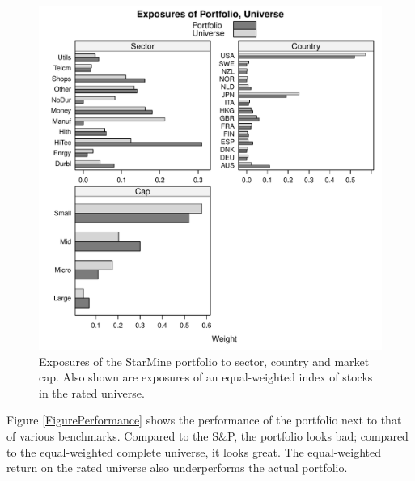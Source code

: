 \documentclass{article}\usepackage{graphicx, color}
\makeatletter
\def\maxwidth{ %
  \ifdim\Gin@nat@width>\linewidth
    \linewidth
  \else
    \Gin@nat@width
  \fi
}
\newenvironment{knitrout}{}{} %
\makeatother
\begin{document}
\begin{figure}
\begin{center}
\begin{knitrout}
\color{fgcolor}
\includegraphics[width=\maxwidth]{figure/unnamed-chunk-6} 

\end{knitrout}

\end{center}
\caption{Exposures of the StarMine portfolio to sector, country and
  market cap. Also shown are exposures of an equal-weighted index of
  stocks in the rated universe.}
\label{FigureExposure}
\end{figure}

Figure \ref{FigurePerformance} shows the performance of the portfolio
next to that of various benchmarks. Compared to the S\&P, the
portfolio looks bad; compared to the equal-weighted complete universe, it looks
great. The equal-weighted return on the
rated universe also underperforms the actual portfolio.
\end{document}
